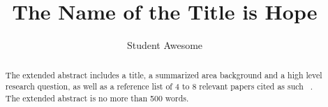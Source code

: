 \documentclass{stylefiles/capstone}
\begin{document}
\title{The Name of the Title is Hope}


\author{Student Awesome}




\renewcommand{\shortauthors}{Awesome}

\renewcommand{\abstractname}{Extended Abstract}
\begin{abstract}
 The extended abstract includes a title, a summarized area background and a high level research question, as well as a reference list of 4 to 8 relevant papers cited as such ~\cite{chipapers}. The extended abstract is no more than 500 words.
\end{abstract}





\maketitle



\end{document}
